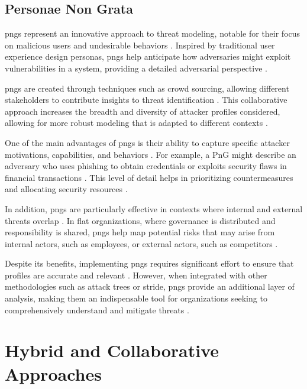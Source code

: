 \subsection{Personae Non Grata}
\label{subsec:personae_non_grata}

\gls{pngs} represent an innovative approach to threat modeling, notable for
their focus on malicious users and undesirable behaviors
\cite{PersonaeNonGratae}. Inspired by traditional user experience design
personas, \gls{pngs} help anticipate how adversaries might exploit
vulnerabilities in a system, providing a detailed adversarial perspective
\cite{PnGRequirementsPhaseThreatModeling}.

\gls{pngs} are created through techniques such as crowd sourcing, allowing
different stakeholders to contribute insights to threat identification
\cite{PnGRequirementsPhaseThreatModeling}. This collaborative approach increases
the breadth and diversity of attacker profiles considered, allowing for more
robust modeling that is adapted to different contexts \cite{PersonaeNonGratae}.

One of the main advantages of \gls{pngs} is their ability to capture specific
attacker motivations, capabilities, and behaviors
\cite{PnGRequirementsPhaseThreatModeling}. For example, a PnG might describe an
adversary who uses phishing to obtain credentials or exploits security flaws in
financial transactions \cite{PersonaeNonGratae}. This level of detail helps in
prioritizing countermeasures and allocating security resources
\cite{PnGRequirementsPhaseThreatModeling}.

In addition, \gls{pngs} are particularly effective in contexts where internal
and external threats overlap \cite{PersonaeNonGratae}. In flat organizations,
where governance is distributed and responsibility is shared, \gls{pngs} help
map potential risks that may arise from internal actors, such as employees, or
external actors, such as competitors \cite{PersonaeNonGratae}.

Despite its benefits, implementing \gls{pngs} requires significant effort to
ensure that profiles are accurate and relevant
\cite{PnGRequirementsPhaseThreatModeling}. However, when integrated with other
methodologies such as attack trees or \gls{stride}, \gls{pngs} provide an
additional layer of analysis, making them an indispensable tool for
organizations seeking to comprehensively understand and mitigate threats
\cite{PnGRequirementsPhaseThreatModeling}.

\section{Hybrid and Collaborative Approaches}
\label{sec:hybrid_collaborative_approaches}

